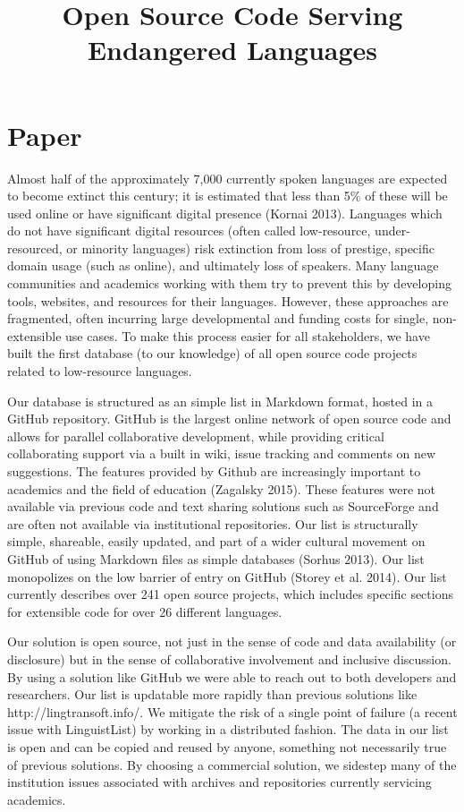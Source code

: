\documentclass[10pt, a4paper]{article}
\title{Open Source Code Serving Endangered Languages}
\begin{document}
\maketitleabstract

\section{Paper}

Almost half of the approximately 7,000 currently spoken languages are expected to
become extinct this century; it is estimated that less than 5\% of these will be used online or have
significant digital presence (Kornai 2013). Languages which do not have significant digital
resources (often called low-resource, under-resourced, or minority languages) risk extinction
from loss of prestige, specific domain usage (such as online), and ultimately loss of speakers.
Many language communities and academics working with them try to prevent this by developing
tools, websites, and resources for their languages. However, these approaches are fragmented,
often incurring large developmental and funding costs for single, non-extensible use cases. To
make this process easier for all stakeholders, we have built the first database (to our knowledge)
of all open source code projects related to low-resource languages.

Our database is structured as an simple list in Markdown format, hosted in a GitHub
repository. GitHub is the largest online network of open source code and allows for parallel
collaborative development, while providing critical collaborating support via a built in wiki,
issue tracking and comments on new suggestions. The features provided by Github are
increasingly important to academics and the field of education (Zagalsky 2015). These features
were not available via previous code and text sharing solutions such as SourceForge and are
often not available via institutional repositories. Our list is structurally simple, shareable, easily
updated, and part of a wider cultural movement on GitHub of using Markdown files as simple
databases (Sorhus 2013). Our list monopolizes on the low barrier of entry on GitHub (Storey et
al. 2014). Our list currently describes over 241 open source projects, which includes specific
sections for extensible code for over 26 different languages.

Our solution is open source, not just in the sense of code and data availability (or disclosure) but
in the sense of collaborative involvement and inclusive discussion. By using a solution like
GitHub we were able to reach out to both developers and researchers. Our list is updatable more
rapidly than previous solutions like http://lingtransoft.info/. We mitigate the risk of a single point
of failure (a recent issue with LinguistList) by working in a distributed fashion. The data in our
list is open and can be copied and reused by anyone, something not necessarily true of previous
solutions. By choosing a commercial solution, we sidestep many of the institution issues
associated with archives and repositories currently servicing academics.
\end{document}
